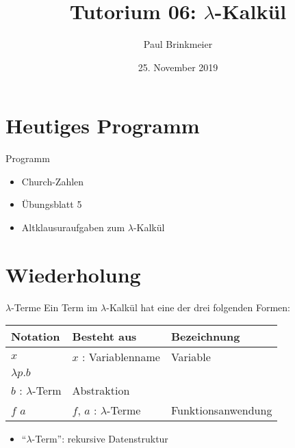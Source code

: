 \documentclass{beamer}
\title{Tutorium 06: $\lambda$-Kalkül}
\author{Paul Brinkmeier}
\institute{Tutorium Programmierparadigmen am KIT}
\date{25. November 2019}
\begin{document}
\begin{frame}
	\titlepage
\end{frame}

\section{Heutiges Programm}
\begin{frame}{Programm}
	\begin{itemize}
		\item Church-Zahlen
		\item Übungsblatt 5
		\item Altklausuraufgaben zum $\lambda$-Kalkül
	\end{itemize}
\end{frame}

\section{Wiederholung}

\begin{frame}{$\lambda$-Terme}
	Ein Term im $\lambda$-Kalkül hat eine der drei folgenden Formen:

	\vspace{0.5cm}

	\begin{tabularx}{\textwidth}{ X | X | X }
		\textbf{Notation} & \textbf{Besteht aus}                      & \textbf{Bezeichnung} \\
		\hline
		$x$               & $x$ : Variablenname                       & Variable             \\
		\hline
		$\lambda{}p.b$    &
			\begin{tabular}[t]{@{}c@{}}$p$ : Variablenname\\$b$ : $\lambda$-Term\end{tabular}
									      & Abstraktion          \\
		\hline
		$f$ $a$           & $f$, $a$ : $\lambda$-Terme                & Funktionsanwendung   \\
	\end{tabularx}

	\vspace{0.5cm}

	\begin{itemize}
		\item \enquote{$\lambda$-Term}: rekursive Datenstruktur
	\end{itemize}
\end{frame}
\end{document}
